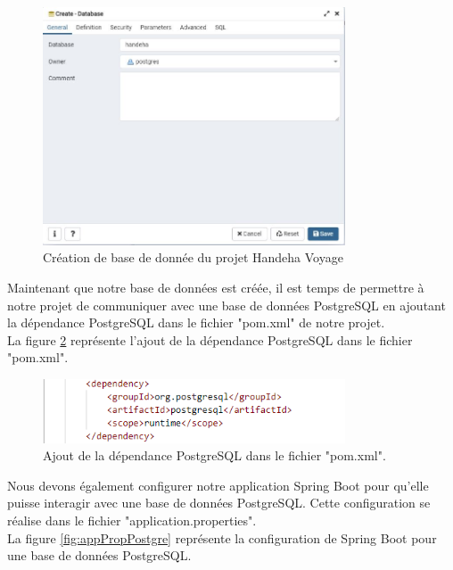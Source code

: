 \documentclass[12pt]{report}
\begin{document}
			\begin{figure}[h]
				\centering
				\includegraphics[width=0.8\textwidth]{DbCreation.jpg}
				\caption{Création de base de donnée du projet Handeha Voyage}
				\label{fig:DbCreation}
			\end{figure}
			\FloatBarrier


			Maintenant que notre base de données est créée, il est temps de permettre à notre projet de communiquer avec une base de données PostgreSQL en ajoutant la dépendance PostgreSQL dans le fichier "pom.xml" de notre projet.\\

			La figure \ref{fig:pomPostgre} représente l'ajout de la dépendance PostgreSQL dans le fichier "pom.xml".
			
			\begin{figure}[h]
				\centering
				\includegraphics[width=0.8\textwidth]{pomPostgre.jpg}
				\caption{Ajout de la dépendance PostgreSQL dans le fichier "pom.xml".}
				\label{fig:pomPostgre}
			\end{figure}
			\FloatBarrier

			Nous devons également configurer notre application Spring Boot pour qu'elle puisse interagir avec une base de données PostgreSQL. Cette configuration se réalise dans le fichier "application.properties".\\
	

			La figure \ref{fig:appPropPostgre} représente la configuration de Spring Boot pour une base de données PostgreSQL.
			
\end{document}
